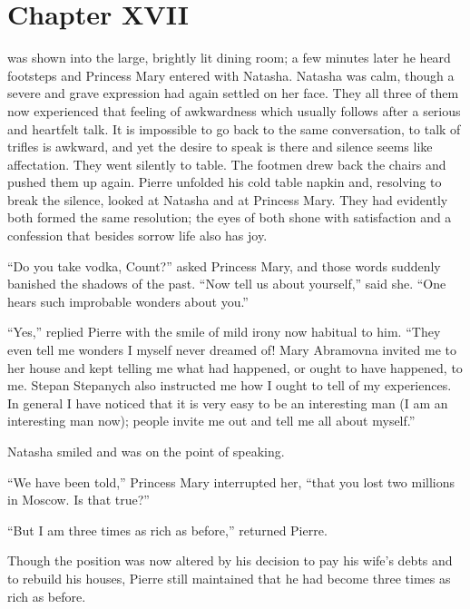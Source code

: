 \chapter*{Chapter XVII}
\ifaudio 
{}
\fi

 was shown into the large, brightly lit dining room; a few
minutes later he heard footsteps and Princess Mary entered with
Natasha. Natasha was calm, though a severe and grave expression
had again settled on her face. They all three of them now
experienced that feeling of awkwardness which usually follows
after a serious and heartfelt talk. It is impossible to go back
to the same conversation, to talk of trifles is awkward, and yet
the desire to speak is there and silence seems like
affectation. They went silently to table. The footmen drew back
the chairs and pushed them up again. Pierre unfolded his cold
table napkin and, resolving to break the silence, looked at
Natasha and at Princess Mary. They had evidently both formed the
same resolution; the eyes of both shone with satisfaction and a
confession that besides sorrow life also has joy.

``Do you take vodka, Count?'' asked Princess Mary, and those
words suddenly banished the shadows of the past. ``Now tell us
about yourself,'' said she. ``One hears such improbable wonders
about you.''

``Yes,'' replied Pierre with the smile of mild irony now habitual
to him.  ``They even tell me wonders I myself never dreamed of!
Mary Abramovna invited me to her house and kept telling me what
had happened, or ought to have happened, to me. Stepan Stepanych
also instructed me how I ought to tell of my experiences. In
general I have noticed that it is very easy to be an interesting
man (I am an interesting man now); people invite me out and tell
me all about myself.''

Natasha smiled and was on the point of speaking.

``We have been told,'' Princess Mary interrupted her, ``that you
lost two millions in Moscow. Is that true?''

``But I am three times as rich as before,'' returned Pierre.

Though the position was now altered by his decision to pay his
wife's debts and to rebuild his houses, Pierre still maintained
that he had become three times as rich as before.

